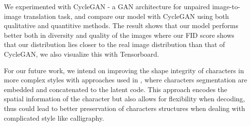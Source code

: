 \documentclass[12pt]{report}
\begin{document}
We experimented with CycleGAN - a GAN architecture for unpaired image-to-image translation task, and compare our model with CycleGAN using both qualitative and quantitive methods. The result shows that our model performs better both in diversity and quality of the images where our FID score shows that our distribution lies closer to the real image distribution than that of CycleGAN, we also visualize this with Tensorboard.

For our future work, we intend on improving the shape integrity of characters in more complex styles with approaches used in \cite{dense-ran}\cite{calligan}, where characters segmentation are embedded and concatenated to the latent code. This approach encodes the spatial information of the character but also allows for flexibility when decoding, thus could lead to better preservation of characters structures when dealing with complicated style like calligraphy. 
\end{document}
